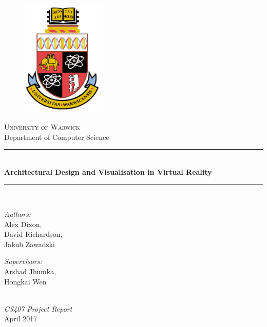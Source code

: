 \documentclass[12pt, a4paper, twoside]{book}
\begin{document}
\frontmatter

\newcommand{\HRule}{\rule{\linewidth}{0.5mm}}

\newcommand{\ttitle}{Architectural Design and Visualisation in Virtual Reality}

\begin{titlepage}
    \begin{center}
        \begin{figure}[ht]
            \centering
            \includegraphics[width=4cm]{crest.jpg}
        \end{figure}
        
        \textsc{\LARGE University of Warwick}\\[0.25cm]
        {\Large{Department of Computer Science}}\\[1.5cm]
        \HRule \\[0.4cm]
        {\huge \bfseries \ttitle}\\
        \HRule \\[1.5cm]
        
        \begin{minipage}{0.4\textwidth}
            \begin{flushleft}
                \large \emph{Authors:}\\Alex Dixon,\\David Richardson,\\Jakub Zawadzki
            \end{flushleft}
        \end{minipage}
        \begin{minipage}{0.4\textwidth}
            \begin{flushright}
                \large \emph{Supervisors:}\\Arshad Jhumka,\\Hongkai Wen
            \end{flushright}
        \end{minipage}\\[1cm]
        
        \textit{\large CS407 Project Report}\\
        {\large April 2017}\\
        
        \vfill
    \end{center}
\end{titlepage}
\end{document}
